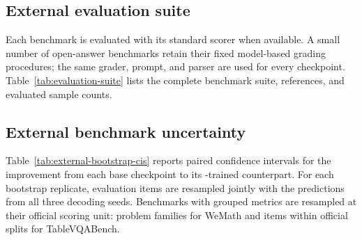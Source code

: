 

\subsection{External evaluation suite}

Each benchmark is evaluated with its standard scorer when available. A small
number of open-answer benchmarks retain their fixed model-based grading
procedures; the same grader, prompt, and parser are used for every checkpoint.
Table~\ref{tab:evaluation-suite} lists the complete benchmark suite, references,
and evaluated sample counts.



\subsection{External benchmark uncertainty}

Table~\ref{tab:external-bootstrap-cis} reports paired confidence intervals for
the improvement from each base checkpoint to its \trace-trained counterpart.
For each bootstrap replicate, evaluation items are resampled jointly with the
predictions from all three decoding seeds. Benchmarks with grouped metrics are
resampled at their official scoring unit: problem families for WeMath and
items within official splits for TableVQABench.



